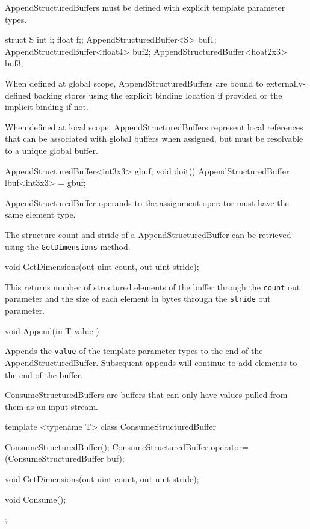 
AppendStructuredBuffers must be defined with explicit template parameter types.
\begin{HLSL}
  struct S {int i; float f;};
  AppendStructuredBuffer<S> buf1;
  AppendStructuredBuffer<float4> buf2;
  AppendStructuredBuffer<float2x3> buf3;
\end{HLSL}

When defined at global scope, AppendStructuredBuffers are bound to externally-defined backing stores
using the explicit binding location if provided or the implicit binding if not.

When defined at local scope, AppendStructuredBuffers represent local references
that can be associated with global buffers when assigned,
but must be resolvable to a unique global buffer.

\begin{HLSL}
  AppendStructuredBuffer<int3x3> gbuf;
  void doit() {
    AppendStructuredBuffer lbuf<int3x3> = gbuf;
  }
\end{HLSL}
AppendStructuredBuffer operands to the assignment operator must have the same element type.


The structure count and stride of a AppendStructuredBuffer can be retrieved using the \texttt{GetDimensions} method.
\begin{HLSL}
void GetDimensions(out uint count, out uint stride);
\end{HLSL}

This returns number of structured elements of the buffer through the \texttt{count} out parameter
and the size of each element in bytes through the \texttt{stride} out parameter.


\begin{HLSL}
   void Append(in T value )
\end{HLSL}

Appends the \texttt{value} of the template parameter types to the end of the AppendStructuredBuffer.
Subsequent appends will continue to add elements to the end of the buffer.


ConsumeStructuredBuffers are buffers that can only have values pulled from them as an input stream.

\begin{HLSL}
template <typename T>
 class ConsumeStructuredBuffer {
   ConsumeStructuredBuffer();
   ConsumeStructuredBuffer operator=(ConsumeStructuredBuffer buf);

   void GetDimensions(out uint count, out uint stride);

   void Consume();
};
\end{HLSL}

